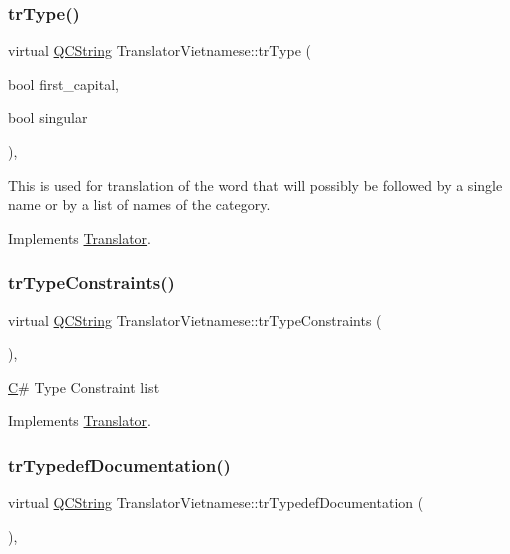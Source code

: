 \subsubsection{\texorpdfstring{trType()}{trType()}}
{\footnotesize\ttfamily virtual \mbox{\hyperlink{class_q_c_string}{Q\+C\+String}} Translator\+Vietnamese\+::tr\+Type (\begin{DoxyParamCaption}\item[{bool}]{first\+\_\+capital,  }\item[{bool}]{singular }\end{DoxyParamCaption})\hspace{0.3cm}{\ttfamily [inline]}, {\ttfamily [virtual]}}

This is used for translation of the word that will possibly be followed by a single name or by a list of names of the category. 

Implements \mbox{\hyperlink{class_translator}{Translator}}.

\mbox{\label{class_translator_vietnamese_a666071701ac65aa7b81fabeedfbb1ea3}} 
\subsubsection{\texorpdfstring{trTypeConstraints()}{trTypeConstraints()}}
{\footnotesize\ttfamily virtual \mbox{\hyperlink{class_q_c_string}{Q\+C\+String}} Translator\+Vietnamese\+::tr\+Type\+Constraints (\begin{DoxyParamCaption}{ }\end{DoxyParamCaption})\hspace{0.3cm}{\ttfamily [inline]}, {\ttfamily [virtual]}}

\mbox{\hyperlink{class_c}{C}}\# Type Constraint list 

Implements \mbox{\hyperlink{class_translator}{Translator}}.

\mbox{\label{class_translator_vietnamese_ad1eaf8ebf07c624c8c5153d00931d424}} 
\subsubsection{\texorpdfstring{trTypedefDocumentation()}{trTypedefDocumentation()}}
{\footnotesize\ttfamily virtual \mbox{\hyperlink{class_q_c_string}{Q\+C\+String}} Translator\+Vietnamese\+::tr\+Typedef\+Documentation (\begin{DoxyParamCaption}{ }\end{DoxyParamCaption})\hspace{0.3cm}{\ttfamily [inline]}, {\ttfamily [virtual]}}

